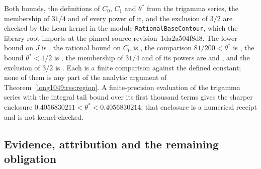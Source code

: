 \documentclass[11pt]{article}
\renewcommand{\commitshort}{1da2a504f8d8}
\begin{document}
Both bounds, the definitions of $C_0$, $C_1$ and $\theta^{*}$ from the trigamma
series, the membership of $31/4$ and of every power of it, and the exclusion of
$3/2$ are checked by the Lean kernel in the module
\texttt{RationalBaseContour}, which the library root imports at the pinned
source revision~\commitshort.  The lower bound on $J$ is
,
the rational bound on $C_0$ is
, the
comparison $81/200<\theta^{*}$ is
, the bound $\theta^{*}<1/2$ is
, the membership of $31/4$ and of its powers are
 and
, and the exclusion of $3/2$ is
.  Each is a finite comparison against the defined constant; none
of them is any part of the analytic argument of
Theorem~\ref{long1049:res:region}.  A finite-precision evaluation of the trigamma series
with the integral tail bound over its first thousand terms gives the sharper
enclosure $0.4056830211<\theta^{*}<0.4056830214$; that enclosure is a numerical
receipt and is not kernel-checked.

\subsection{Evidence, attribution and the remaining obligation}
\end{document}
